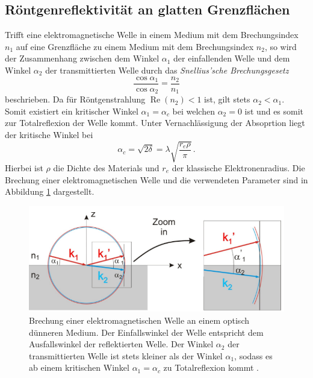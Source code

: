 \subsection{Röntgenreflektivität an glatten Grenzflächen}
Trifft eine elektromagnetische Welle in einem Medium mit dem Brechungsindex $n_1$ auf eine Grenzfläche zu einem Medium mit dem Brechungsindex $n_2$, so wird der Zusammenhang zwischen dem Winkel $\alpha_1$ der einfallenden Welle und dem Winkel $\alpha_2$ der transmittierten Welle durch das \textit{Snellius'sche Brechungsgesetz}
\begin{equation}
    \frac{\cos{\alpha_1}}{\cos{\alpha_2}}=\frac{n_2}{n_1}
\end{equation}
beschrieben.
Da für Röntgenstrahlung $\operatorname{Re}(n_2)<1$ ist, gilt stets $\alpha_2 < \alpha_1$.
Somit existiert ein kritischer Winkel $\alpha_1 = \alpha_c$ bei welchen $\alpha_2=0$ ist und es somit zur Totalreflexion der Welle kommt.
Unter Vernachlässigung der Absoprtion liegt der kritische Winkel bei 
\begin{equation}
    \alpha_c = \sqrt{2\delta} = \lambda \sqrt{\frac{r_e \rho}{\pi}}\, .
\end{equation}
Hierbei ist $\rho$ die Dichte des Materials und $r_e$ der klassische Elektronenradius.
Die Brechung einer elektromagnetischen Welle und die verwendeten Parameter sind in Abbildung \ref{fig:tfig1} dargestellt.
\begin{figure}[H]
\centering
\includegraphics[width=0.8\linewidth]{figures/Reflexion}
\caption{Brechung einer elektromagnetischen Welle an einem optisch dünneren Medium. 
Der Einfallswinkel der Welle entspricht dem Ausfallswinkel der reflektierten Welle. 
Der Winkel $\alpha_2$ der transmittierten Welle ist stets kleiner als der Winkel $\alpha_1$, sodass es ab einem kritischen Winkel $\alpha_1 = \alpha_c$ zu Totalreflexion kommt \cite{XSR}.}
\label{fig:tfig1}
\end{figure}

